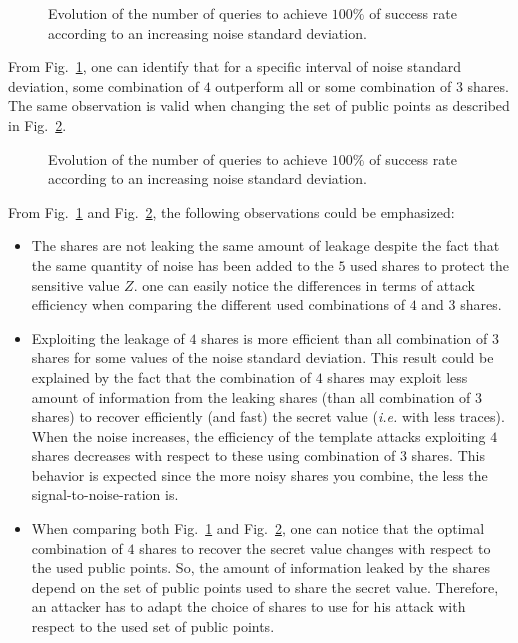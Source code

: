 \documentclass{llncs}
\begin{document}
\begin{figure}
\begin{center}
\caption{Evolution of the number of queries to achieve $100\%$ of success rate according to an increasing noise standard deviation.}
\label{fig_4_shares}
\end{center}
\end{figure}

From Fig.~\ref{fig_4_shares}, one can identify that for a specific interval of noise standard deviation, some combination of $4$ outperform all or some combination of $3$ shares. The same observation is valid when changing the set of public points as described in Fig.~\ref{fig_4_shares_bis}.

\begin{figure}
\begin{center}
\caption{Evolution of the number of queries to achieve $100\%$ of success rate according to an increasing noise standard deviation.}
\label{fig_4_shares_bis}
\end{center}
\end{figure}

From Fig.~\ref{fig_4_shares} and Fig.~\ref{fig_4_shares_bis}, the following observations could be emphasized:

\begin{itemize}
\item The shares are not leaking the same amount of leakage despite the fact that the same quantity of noise has been added to the $5$ used shares to protect the sensitive value $Z$. one can easily notice the differences in terms of attack efficiency when comparing the different used combinations of $4$ and $3$ shares.
\item Exploiting the leakage of $4$ shares is more efficient than all combination of $3$ shares for some values of the noise standard deviation. This result could be explained by the fact that the combination of $4$ shares may exploit less amount of information from the leaking shares (than all combination of $3$ shares) to recover efficiently (and fast) the secret value (\emph{i.e.} with less traces). When the noise increases, the efficiency of the template attacks exploiting $4$ shares decreases with respect to these using combination of $3$ shares. This behavior is expected since the more noisy shares you combine, the less the signal-to-noise-ration is. 
\item When comparing both Fig.~\ref{fig_4_shares} and Fig.~\ref{fig_4_shares_bis}, one can notice that the optimal combination of $4$ shares to recover the secret value changes with respect to the used public points. So, the amount of information leaked by the shares depend on the set of public points used to share the secret value. Therefore, an attacker has to adapt the choice of shares to use for his attack with respect to the used set of public points.
\end{itemize}
\end{document}
